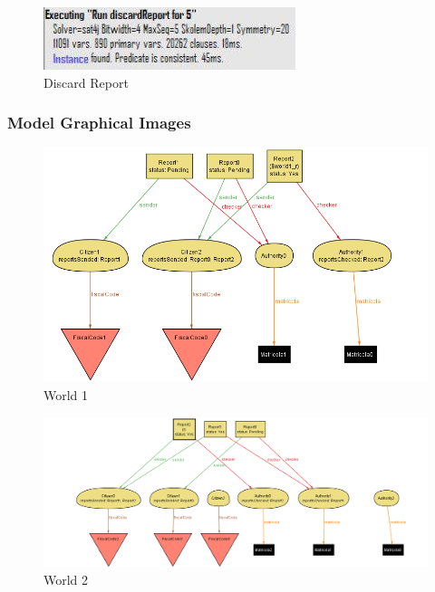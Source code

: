 \documentclass{article}
\begin{document}
\begin{figure}[H]
    \centering
    \includegraphics[scale=0.9]{img/alloy/discardReport.png}
    \caption{Discard Report}
\end{figure}

\clearpage

\subsubsection{Model Graphical Images}

\begin{figure}[H]
    \centering
    \includegraphics[scale=0.4]{img/alloy/world1_magic.png}
    \caption{World 1}
\end{figure}

\begin{figure}[H]
    \centering
    \includegraphics[scale=0.4]{img/alloy/world2_magic.png}
    \caption{World 2}
\end{figure}
\end{document}
